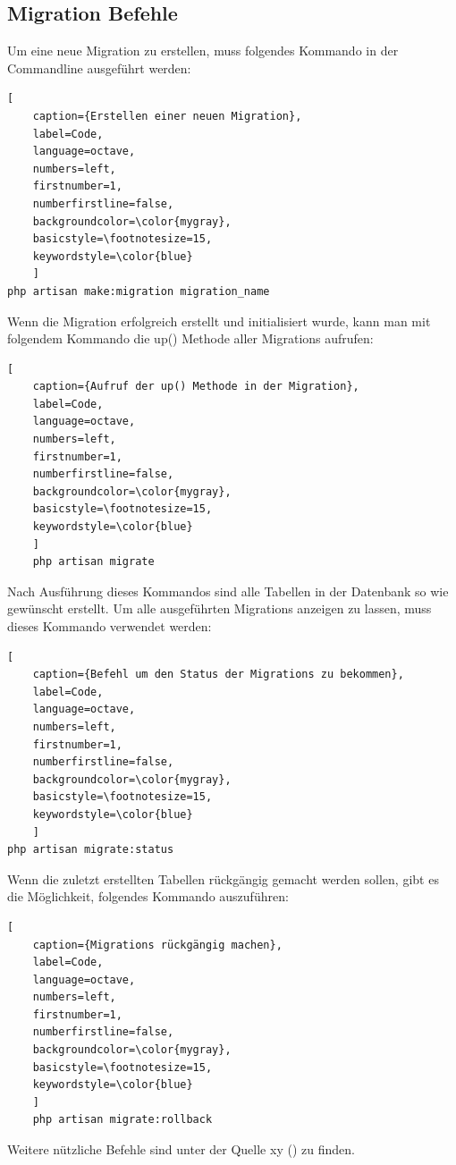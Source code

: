\subsection{Migration Befehle}\label{sec Migration Befehle}
Um eine neue Migration zu erstellen, muss folgendes Kommando in der Commandline ausgeführt werden:
\renewcommand{\lstlistingname}{Quellcode}

\begin{lstlisting}[
	caption={Erstellen einer neuen Migration},
	label=Code,
	language=octave,
	numbers=left,
	firstnumber=1,
	numberfirstline=false,
	backgroundcolor=\color{mygray},
	basicstyle=\footnotesize=15,
	keywordstyle=\color{blue}
	]
php artisan make:migration migration_name
\end{lstlisting}
Wenn die Migration erfolgreich erstellt und initialisiert wurde, kann man mit folgendem Kommando die up() Methode aller Migrations aufrufen:
\renewcommand{\lstlistingname}{Quellcode}

\begin{lstlisting}[
	caption={Aufruf der up() Methode in der Migration},
	label=Code,
	language=octave,
	numbers=left,
	firstnumber=1,
	numberfirstline=false,
	backgroundcolor=\color{mygray},
	basicstyle=\footnotesize=15,
	keywordstyle=\color{blue}
	]
	php artisan migrate
\end{lstlisting}
Nach Ausführung dieses Kommandos sind alle Tabellen in der Datenbank so wie gewünscht erstellt. 
Um alle ausgeführten Migrations anzeigen zu lassen, muss dieses Kommando verwendet werden:
\renewcommand{\lstlistingname}{Quellcode}

\begin{lstlisting}[
	caption={Befehl um den Status der Migrations zu bekommen},
	label=Code,
	language=octave,
	numbers=left,
	firstnumber=1,
	numberfirstline=false,
	backgroundcolor=\color{mygray},
	basicstyle=\footnotesize=15,
	keywordstyle=\color{blue}
	]
php artisan migrate:status
\end{lstlisting}
Wenn die zuletzt erstellten Tabellen rückgängig gemacht werden sollen, gibt es die Möglichkeit, folgendes Kommando auszuführen:
\renewcommand{\lstlistingname}{Quellcode}

\begin{lstlisting}[
	caption={Migrations rückgängig machen},
	label=Code,
	language=octave,
	numbers=left,
	firstnumber=1,
	numberfirstline=false,
	backgroundcolor=\color{mygray},
	basicstyle=\footnotesize=15,
	keywordstyle=\color{blue}
	]
	php artisan migrate:rollback 
\end{lstlisting}
Weitere nützliche Befehle sind unter  der Quelle xy () zu finden.

